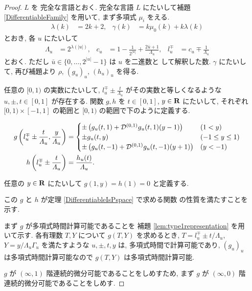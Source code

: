 \begin{proof}
 $L$ を \PSPACE 完全な言語とおく.
 \PSPACE 完全な言語 $L$ にたいして補題 \ref{DifferentiableFamily} を用いて,
 まず多項式 $\mu_i$ をえる.
 \begin{align}
  \lambda(k) &= 2k + 2,&
  \gamma(k) &= k \mu_0(k) + k \lambda(k)
 \end{align}
 とおき, 各 $u$ にたいして 
\begin{align}
 \Lambda_u 
 &= 2^{\lambda(|u|)}, &
 c_u 
 &= 1-\frac{1}{2^{|u|}}+\frac{2\bar{u}+1}{\Lambda_u}, &
 l_u^\mp 
 &= c_u\mp\frac{1}{\varLambda_u} 
\end{align}  
 とおく. ただし $\bar u \in \{0, \dots, 2^{|u|} - 1\}$ は $u$ を二進数と
 して解釈した数.
 $\gamma$ にたいして, 再び補題より $\rho$, $(g_u)_u$, $(h_u)_u$ を得る.



 任意の $[0,1)$ の実数にたいして,
 $l^\mp_u \pm \frac{t}{\Lambda_u}$ がその実数と等しくなるような
 $u, \pm, t\in [0,1]$ が存在する.
 関数 $g, h$ を $t \in [0,1]$, $y \in \mathbf R$ にたいして,
 それぞれ $[0,1) \times [-1,1]$ の範囲と $[0,1)$ の範囲で下のように定義する.

 \begin{align}
  g\left(l^\mp_u \pm \frac{t}{\varLambda_u}, \frac{y}{\varLambda_u}\right)
  &= \begin{cases}
      \pm \left( g_u(t,1) 
      + \mathcal D^{(0,1)}g_u(t, 1)(y-1) \right)&  (1<y)\\
      \pm g_u(t, y) & (-1 \le y \le 1) \\
      \pm \left( g_u(t, -1) + \mathcal D^{(0,1)} g_u(t, -1)(y+1) \right) & (y<-1)
     \end{cases}
  \\
  h \left( l^\mp_u \pm \frac{t}{\varLambda_u} \right) 
  &= \frac{h_u(t)}{\varLambda_u}.
\end{align}

 任意の $y \in \mathbf R$ にたいして $g(1,y) = h(1) = 0$ と定義する.

 この $g$ と $h$ が定理 \ref{DifferentiableIsPspace} で求める関数
 の性質を満たすことを示す.
 
 まず $g$ が多項式時間計算可能であることを
 補題 \ref{lem:type1representation} を用いて示す.
 各有理数 $T,Y$ について $g(T, Y)$ を求めるとき,
 $T=l_u^\mp \pm t/\Lambda_u$, $Y = y/\Lambda_u\Gamma_u$ を満たすような
 $u, \pm, t, y$ は, 多項式時間で計算可能であり,
 $(g_u)_u$ は多項式時間計算可能なので $g(T, Y)$ は多項式時間計算可能.

 $g$ が $(\infty, 1)$ 階連続的微分可能であることをしめすため,
 まず $g$ が $(\infty, 0)$ 階連続的微分可能であることをしめす.
 

\end{proof}
